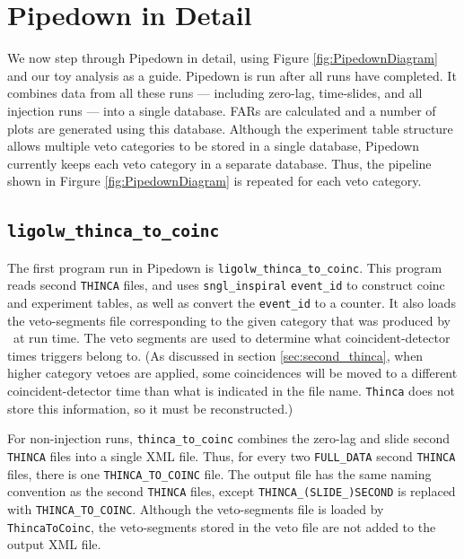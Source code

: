 \section{Pipedown in Detail}
\label{sec:PipedownDetail}

We now step through Pipedown in detail, using Figure \ref{fig:PipedownDiagram}
and our toy analysis as a guide. Pipedown is run after all \hipe runs have
completed. It combines data from all these runs --- including zero-lag,
time-slides, and all injection runs --- into a single database. \acp{FAR} are
calculated and a number of plots are generated using this database. Although
the experiment table structure allows multiple veto categories to be stored in
a single database, Pipedown currently keeps each veto category in a separate
database. Thus, the pipeline shown in Firgure \ref{fig:PipedownDiagram} is
repeated for each veto category.

\subsection{\texttt{ligolw\_thinca\_to\_coinc}}
\label{sec:thinca_to_coinc}

The first program run in Pipedown is \texttt{ligolw\_thinca\_to\_coinc}. This
program reads second \texttt{THINCA} files, and uses \texttt{sngl\_inspiral}
\texttt{event\_id} to construct coinc and experiment tables, as well as convert
the \texttt{event\_id} to a counter. It also loads the veto-segments file
corresponding to the given category that was produced by \ihope~at run time.
The veto segments are used to determine what coincident-detector times triggers
belong to. (As discussed in section \ref{sec:second_thinca}, when higher
category vetoes are applied, some coincidences will be moved to a different
coincident-detector time than what is indicated in the file name.
\texttt{Thinca} does not store this information, so it must be reconstructed.)


For non-injection runs, \texttt{thinca\_to\_coinc} combines the zero-lag and
slide second \texttt{THINCA} files into a single XML file. Thus, for every two
\texttt{FULL\_DATA} second \texttt{THINCA} files, there is one
\texttt{THINCA\_TO\_COINC} file. The output file has the same naming convention
as the second \texttt{THINCA} files, except \texttt{THINCA\_(SLIDE\_)SECOND} is
replaced with \texttt{THINCA\_TO\_COINC}. Although the veto-segments file is
loaded by \texttt{ThincaToCoinc}, the veto-segments stored in the veto file are
not added to the output XML file.

